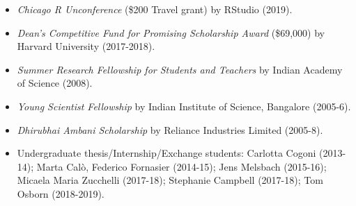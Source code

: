 \documentclass[10pt]{article}
\begin{document}
	\begin{itemize}
	\item \textit{Chicago R Unconference} (\$200 Travel grant) by RStudio (2019).
			
	
	\item \textit{Dean's Competitive Fund for Promising Scholarship Award} (\$69,000) by Harvard University (2017-2018).
		
	
	\item {\it Summer Research Fellowship for Students and Teachers} by Indian Academy of Science (2008).
	
	
	\item {\it Young Scientist Fellowship} by Indian Institute of Science, Bangalore (2005-6).
	
	
	\item {\it Dhirubhai Ambani Scholarship} by Reliance Industries Limited (2005-8). 	
	\end{itemize}
	
	
	\begin{itemize}
	\item Undergraduate thesis/Internship/Exchange students: Carlotta Cogoni (2013-14); Marta Cal\`{o}, Federico Fornasier (2014-15); Jens Melsbach (2015-16); Micaela Maria Zucchelli (2017-18); Stephanie Campbell (2017-18); Tom Osborn (2018-2019).
	\end{itemize}
	
\end{document}

